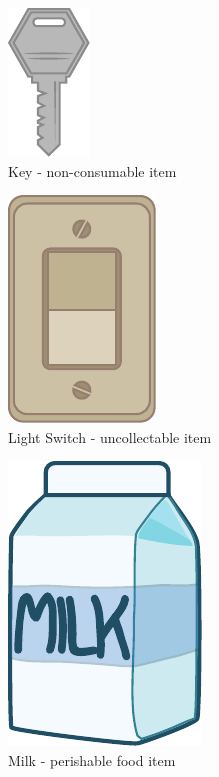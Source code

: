 \begin{figure}[p]
	\centering\includegraphics[height=.8\paperheight]{images/items_key}
	\caption{Key - non-consumable item}
\end{figure}
\begin{figure}[p]
	\centering\includegraphics[height=.8\paperheight]{images/items_lightswitch}
	\caption{Light Switch - uncollectable item}
\end{figure}
\begin{figure}[p]
	\centering\includegraphics[height=.8\paperheight]{images/items_milk}
	\caption{Milk - perishable food item}
\end{figure}
